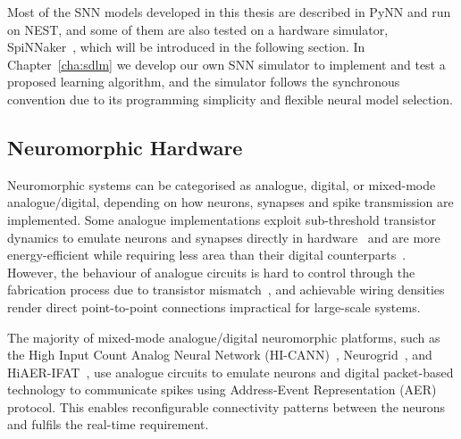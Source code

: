 Most of the SNN models developed in this thesis are described in PyNN and run on NEST, and some of them are also tested on a hardware simulator, SpiNNaker~\citep{furber2014spinnaker}, which will be introduced in the following section.
In Chapter~\ref{cha:sdlm} we develop our own SNN simulator to implement and test a proposed learning algorithm, and the simulator follows the synchronous convention due to its programming simplicity and flexible neural model selection. 

\subsection{Neuromorphic Hardware}
\label{subsec:neuromorphic_hw}
Neuromorphic systems can be categorised as analogue, digital, or mixed-mode analogue/digital, depending on how neurons, synapses and spike transmission are implemented. %
Some analogue implementations exploit sub-threshold transistor dynamics to emulate neurons and synapses directly in hardware~\citep{indiveri2011neuromorphic} and are more energy-efficient while requiring less area than their digital counterparts~\citep{joubert2012hardware}.
However, the behaviour of analogue circuits is hard to control through the fabrication process due to transistor mismatch~\citep{indiveri2011neuromorphic,pedram2006thermal,linares2003compact}, and achievable wiring densities render direct point-to-point connections impractical for large-scale systems.

The majority of mixed-mode analogue/digital neuromorphic platforms, such as the High Input Count Analog Neural Network (HI-CANN)~\citep{schemmel2010wafer}, Neurogrid~\citep{benjamin2014neurogrid}, and HiAER-IFAT~\citep{yu201265k}, use analogue circuits to emulate neurons and digital packet-based technology to communicate spikes using Address-Event Representation (AER)~\citep{lazzaro1995multi} protocol.
This enables reconfigurable connectivity patterns between the neurons and fulfils the real-time requirement.

